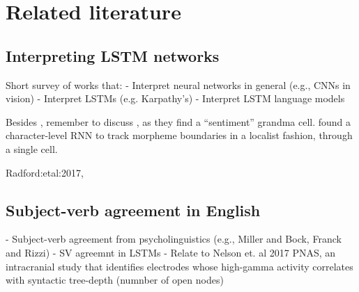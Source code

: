 
\section{Related literature}

\subsection{Interpreting LSTM networks}
Short survey of works that:
- Interpret neural networks in general (e.g., CNNs in vision)
- Interpret LSTMs (e.g. Karpathy's)
- Interpret LSTM language models

Besides , remember to discuss
, as they find a ``sentiment'' grandma cell.
 found a character-level RNN to
track morpheme boundaries in a localist fashion, through a single
cell.

Radford:etal:2017,

\subsection{Subject-verb agreement in English}
- Subject-verb agreement from psycholinguistics (e.g., Miller and Bock, Franck and Rizzi)
- SV agreemnt in LSTMs \cite{Linzen:etal:2016,Bernardy:Lappin:2017,Gulordava:etal:2018,Kuncoro:etal:2018a,Kuncoro:etal:2018b,Linzen:Leonard:2018}
- Relate to Nelson et. al 2017 PNAS, an intracranial study that identifies electrodes whose high-gamma activity correlates with syntactic tree-depth (numnber of open nodes)
